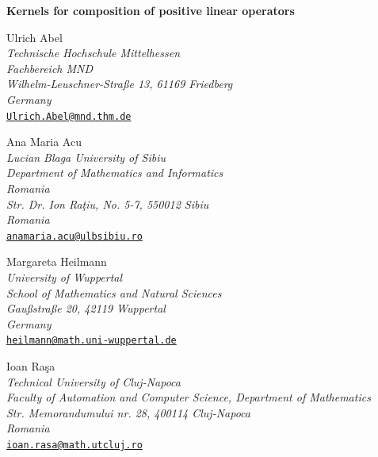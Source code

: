 \documentclass[12pt,reqno]{article}
\begin{document}
\begin{center}
\vskip1cm

{\LARGE \textbf{Kernels for composition of positive linear operators}}

\vspace{2cm}

{\large Ulrich Abel}\\[0pt]
\textit{Technische Hochschule Mittelhessen}\\[0pt]
\textit{Fachbereich MND}\\[0pt]
\textit{Wilhelm-Leuschner-Stra\ss e 13, 61169 Friedberg }\\[0pt]
\textit{Germany}\\[0pt]
\href{mailto:Ulrich.Abel@mnd.thm.de}{\texttt{Ulrich.Abel@mnd.thm.de}}

\vspace{1cm}

{\large Ana Maria Acu}\\[0pt]
\textit{Lucian Blaga University of Sibiu}\\[0pt]
\textit{Department of Mathematics and Informatics}\\[0pt]
\textit{Romania}\\[0pt]
\textit{Str. Dr. Ion Ra\c tiu, No. 5-7, 550012 Sibiu}\\[0pt]
\textit{Romania}\\[0pt]
\href{mailto:anamaria.acu@ulbsibiu.ro}{\texttt{anamaria.acu@ulbsibiu.ro}}

\vspace{1cm}

{\large Margareta Heilmann}\\[0pt]
\textit{University of Wuppertal}\\[0pt]
\textit{School of Mathematics and Natural Sciences}\\[0pt]
\textit{Gau\ss straße 20, 42119 Wuppertal}\\[0pt]
\textit{Germany}\\[0pt]
\href{mailto:heilmann@math.uni-wuppertal.de}{\texttt{heilmann@math.uni-wuppertal.de}}

\vspace{1cm}

{\large Ioan Ra\c sa}\\[0pt]
\textit{Technical University of Cluj-Napoca}\\[0pt]
\textit{Faculty of Automation and Computer Science, Department of Mathematics}\\[0pt]
\textit{Str. Memorandumului nr. 28, 400114 Cluj-Napoca}\\[0pt]
\textit{Romania}\\[0pt]
\href{mailto:ioan.rasa@math.utcluj.ro}{\texttt{ioan.rasa@math.utcluj.ro}}

\end{center}
\end{document}
